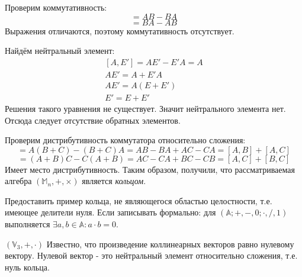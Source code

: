 \begin{task}
\begin{enumerate}
\begin{solution}
            Проверим коммутативность:
            \begin{equation*}
                [A,B]=AB-BA
            \end{equation*}
            \begin{equation*}
                [B,A]=BA-AB
            \end{equation*}
            Выражения отличаются, поэтому коммутативность отсутствует.

            Найдём нейтральный элемент:
            \begin{equation*}
                \begin{gathered}
                    \left[A, E'\right]=AE'-E'A=A\\
                    AE'=A+E'A\\
                    AE'=A(E+E')\\
                    E'=E+E'
                \end{gathered}
            \end{equation*}
            Решения такого уравнения не существует. Значит нейтрального элемента нет. Отсюда следует отсутствие обратных элементов.

            Проверим дистрибутивность коммутатора относительно сложения:
            \begin{equation*}
                [A, B+C] = A(B+C)-(B+C)A=AB-BA+AC-CA=[A,B]+[A,C]
            \end{equation*}
            \begin{equation*}
                [A+B,C]=(A+B)C-C(A+B)=AC-CA+BC-CB=[A,C]+[B,C]
            \end{equation*}
            Имеет место дистрибутивность.
            Таким образом, получили, что рассматриваемая алгебра $(\mathbb{M}_n, +, \times)$ является \textit{кольцом}.
        \end{solution}
    \end{enumerate}
\end{task}

\begin{task}
    Предоставить пример кольца, не являющегося областью целостности, т.е. имеющее делители нуля. Если записывать формально: для $(\mathbb{A}; +, -, 0; \cdot, /, 1)$ выполняется $\exists a,b\in \mathbb{A}: a \cdot b = 0$.

    \begin{solution}
        $(\mathbb{V}_3, +, \cdot)$ Известно, что произведение коллинеарных векторов равно нулевому вектору. Нулевой вектор - это нейтральный элемент относительно сложения, т.е. нуль кольца.
    \end{solution}
\end{task}

